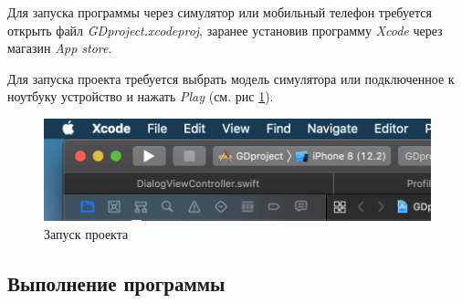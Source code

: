 \documentclass[a4paper,12pt]{article}
\begin{document}
	Для запуска программы через симулятор или мобильный телефон требуется открыть файл \textit{GDproject.xcodeproj}, заранее установив программу \textit{Xcode} через магазин \textit{App store}. 
	
	Для запуска проекта требуется выбрать модель симулятора или подключенное к ноутбуку устройство и нажать \textit{Play} (см. рис \ref{pic: Play}).
	
	\begin{figure}[h]
		\centering
		\includegraphics[width = 0.6\linewidth]{../includes/ro/play.png}
		\caption{Запуск проекта}
		\label{pic: Play}
	\end{figure}
	
	\subsection{Выполнение программы}
\end{document}
